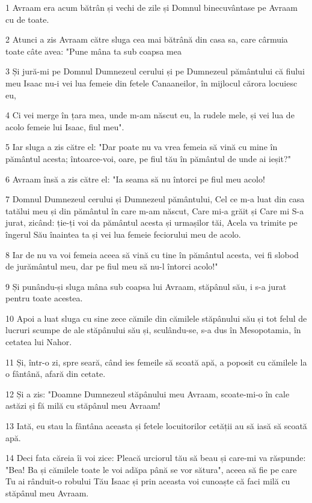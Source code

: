\par 1 Avraam era acum bătrân și vechi de zile și Domnul binecuvântase pe Avraam cu de toate.
\par 2 Atunci a zis Avraam către sluga cea mai bătrână din casa sa, care cârmuia toate câte avea: "Pune mâna ta sub coapsa mea
\par 3 Și jură-mi pe Domnul Dumnezeul cerului și pe Dumnezeul pământului că fiului meu Isaac nu-i vei lua femeie din fetele Canaaneilor, în mijlocul cărora locuiesc eu,
\par 4 Ci vei merge în țara mea, unde m-am născut eu, la rudele mele, și vei lua de acolo femeie lui Isaac, fiul meu".
\par 5 Iar sluga a zis către el: "Dar poate nu va vrea femeia să vină cu mine în pământul acesta; întoarce-voi, oare, pe fiul tău în pământul de unde ai ieșit?"
\par 6 Avraam însă a zis către el: "Ia seama să nu întorci pe fiul meu acolo!
\par 7 Domnul Dumnezeul cerului și Dumnezeul pământului, Cel ce m-a luat din casa tatălui meu și din pământul în care m-am născut, Care mi-a grăit și Care mi S-a jurat, zicând: ție-ți voi da pământul acesta și urmașilor tăi, Acela va trimite pe îngerul Său înaintea ta și vei lua femeie feciorului meu de acolo.
\par 8 Iar de nu va voi femeia aceea să vină cu tine în pământul acesta, vei fi slobod de jurământul meu, dar pe fiul meu să nu-l întorci acolo!"
\par 9 Și punându-și sluga mâna sub coapsa lui Avraam, stăpânul său, i s-a jurat pentru toate acestea.
\par 10 Apoi a luat sluga cu sine zece cămile din cămilele stăpânului său și tot felul de lucruri scumpe de ale stăpânului său și, sculându-se, s-a dus în Mesopotamia, în cetatea lui Nahor.
\par 11 Și, într-o zi, spre seară, când ies femeile să scoată apă, a poposit cu cămilele la o fântână, afară din cetate.
\par 12 Și a zis: "Doamne Dumnezeul stăpânului meu Avraam, scoate-mi-o în cale astăzi și fă milă cu stăpânul meu Avraam!
\par 13 Iată, eu stau la fântâna aceasta și fetele locuitorilor cetății au să iasă să scoată apă.
\par 14 Deci fata căreia îi voi zice: Pleacă urciorul tău să beau și care-mi va răspunde: "Bea! Ba și cămilele toate le voi adăpa până se vor sătura", aceea să fie pe care Tu ai rânduit-o robului Tău Isaac și prin aceasta voi cunoaște că faci milă cu stăpânul meu Avraam.
